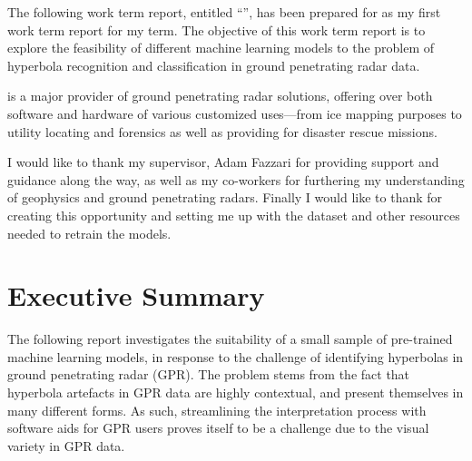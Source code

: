 \documentclass[se,blockletter]{uw-wkrpt}
\begin{document}
\newcommand{\thecompany}{Sensors \& Software Inc.}

\frontmatter

\begin{letter}

The following work term report, entitled ``\thetitle{}'', has been prepared for \theemployer{} as my first work term report for my \theterm{} term. The objective of this work term report is to explore the feasibility of different machine learning models to the problem of hyperbola recognition and classification in ground penetrating radar data. 

\theemployer{} is a major provider of ground penetrating radar solutions, offering over both software and hardware of various customized uses---from ice mapping purposes to utility locating and forensics as well as providing for disaster rescue missions.

I would like to thank my supervisor, Adam Fazzari for providing support and guidance along the way, as well as my co-workers for furthering my understanding of geophysics and ground penetrating radars. Finally I would like to thank \theemployer{} for creating this opportunity and setting me up with the dataset and other resources needed to retrain the models. 

\end{letter}

\section{Executive Summary}
The following report investigates the suitability of a small sample of pre-trained machine learning models, in response to the challenge of identifying hyperbolas in ground penetrating radar (GPR). The problem stems from the fact that hyperbola artefacts in GPR data are highly contextual, and present themselves in many different forms. As such, streamlining the interpretation process with software aids for GPR users proves itself to be a challenge due to the visual variety in GPR data.
\end{document}
